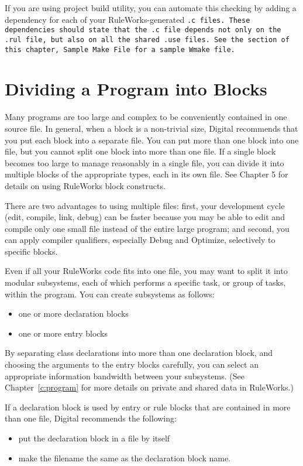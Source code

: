 If you are using project build utility, you can automate this checking
by adding a dependency for each of your RuleWorks-generated \tt{.c}
files. These dependencies should state that the \tt{.c} file depends
not only on the \tt{.rul} file, but also on all the shared \tt{.use}
files. See the section of this chapter, Sample Make File for a sample
Wmake file.

\section{Dividing a Program into Blocks}

Many programs are too large and complex to be conveniently contained
in one source file. In general, when a block is a non-trivial size,
Digital recommends that you put each block into a separate file. You
can put more than one block into one file, but you cannot split one
block into more than one file. If a single block becomes too large to
manage reasonably in a single file, you can divide it into multiple
blocks of the appropriate types, each in its own file. See Chapter 5
for details on using RuleWorks block constructs.

There are two advantages to using multiple files: first, your
development cycle (edit, compile, link, debug) can be faster because
you may be able to edit and compile only one small file instead of the
entire large program; and second, you can apply compiler qualifiers,
especially Debug and Optimize, selectively to specific blocks.

Even if all your RuleWorks code fits into one file, you may want to
split it into modular subsystems, each of which performs a specific
task, or group of tasks, within the program. You can create subsystems
as follows:

\begin{itemize}
\item one or more declaration blocks
\item one or more entry blocks
\end{itemize}

By separating class declarations into more than one declaration block,
and choosing the arguments to the entry blocks carefully, you can
select an appropriate information bandwidth between your
subsystems. (See Chapter~\ref{c:program} for more details on private
and shared data in RuleWorks.)

\begin{note}
  If a declaration block is used by entry or rule blocks that are
  contained in more than one file, Digital recommends the following:
  \begin{itemize}
  \item put the declaration block in a file by itself
  \item make the filename the same as the declaration block name.
  \end{itemize}
\end{note}

